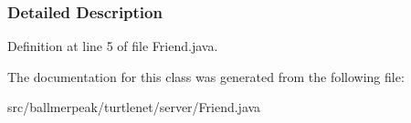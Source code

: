 \subsubsection{Detailed Description}


Definition at line 5 of file Friend.\-java.



The documentation for this class was generated from the following file\-:\begin{DoxyCompactItemize}
\item 
src/ballmerpeak/turtlenet/server/Friend.\-java\end{DoxyCompactItemize}
